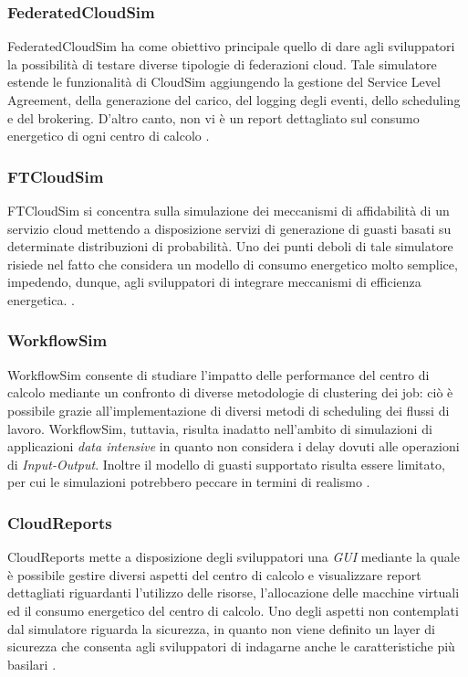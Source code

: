 {\subsubsection*{FederatedCloudSim}
FederatedCloudSim \cite{kohne2014federatedcloudsim} ha come obiettivo principale quello di dare agli sviluppatori la possibilità di testare diverse tipologie di federazioni cloud. Tale simulatore estende le funzionalità di CloudSim aggiungendo la gestione del Service Level Agreement, della generazione del carico, del logging degli eventi, dello scheduling e del brokering. D'altro canto, non vi è un report dettagliato sul consumo energetico di ogni centro di calcolo \cite{mansouri2020cloud}.  
\subsubsection*{FTCloudSim}
FTCloudSim \cite{zhou2013ftcloudsim} si concentra sulla simulazione dei meccanismi di affidabilità di un servizio cloud mettendo a disposizione servizi di generazione di guasti basati su determinate distribuzioni di probabilità. Uno dei punti deboli di tale simulatore risiede nel fatto che considera un modello di consumo energetico molto semplice, impedendo, dunque, agli sviluppatori di integrare meccanismi di efficienza energetica. \cite{mansouri2020cloud}. 
\subsubsection*{WorkflowSim}
WorkflowSim \cite{chen2012workflowsim} consente di studiare l'impatto delle performance del centro di calcolo mediante un confronto di diverse metodologie di clustering dei job: ciò è possibile grazie all'implementazione di diversi metodi di scheduling dei flussi di lavoro. WorkflowSim, tuttavia, risulta inadatto nell'ambito di simulazioni di applicazioni \emph{data intensive} in quanto non considera i delay dovuti alle operazioni di \emph{Input-Output}. Inoltre il modello di guasti supportato risulta essere limitato, per cui le simulazioni potrebbero peccare in termini di realismo \cite{mansouri2020cloud}. 
\subsubsection*{CloudReports}
CloudReports \cite{teixeira2014cloudreports} mette a disposizione degli sviluppatori una \emph{GUI} mediante la quale è possibile gestire diversi aspetti del centro di calcolo e visualizzare report dettagliati riguardanti l'utilizzo delle risorse, l'allocazione delle macchine virtuali ed il consumo energetico del centro di calcolo. Uno degli aspetti non contemplati dal simulatore riguarda la sicurezza, in quanto non viene definito un layer di sicurezza che consenta agli sviluppatori di indagarne anche le caratteristiche più basilari \cite{mansouri2020cloud}.
}
